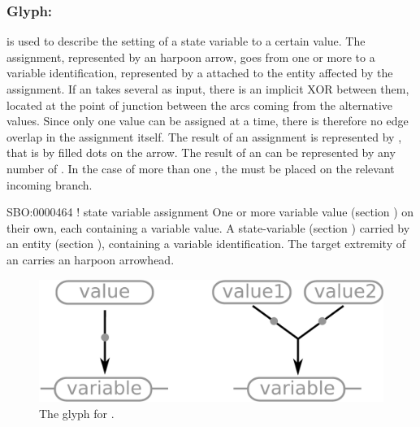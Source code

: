 
\subsubsection{Glyph: }\label{sec:assignment}

 is used to describe the setting of a state variable to a certain value. The assignment, represented by an harpoon arrow, goes from one or more  to a variable identification, represented by a  attached to the entity affected by the assignment. If an  takes several  as input, there is an implicit XOR between them, located at the point of junction between the arcs coming from the alternative values. Since only one value can be assigned at a time, there is therefore no edge overlap in the assignment itself. The result of an assignment is represented by , that is by filled dots on the arrow. The result of an  can be represented by any number of . In the case of more than one , the  must be placed on the relevant incoming branch.

\begin{glyphDescription}
 \glyphSboTerm SBO:0000464 ! state variable assignment
 \glyphOrigin One or more variable value (section ) on their own, each containing a variable value.
 \glyphTarget A state-variable (section ) carried by an entity (section ), containing a variable identification.
 \glyphEndPoint The target extremity of an  carries an harpoon arrowhead.
 \end{glyphDescription}

\begin{figure}[H]
  \centering
  \includegraphics[scale = 0.3]{images/assignment}
  \caption{The \ER glyph for .}
  \label{fig:assignment}
\end{figure}


